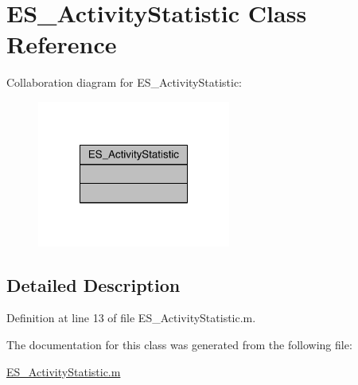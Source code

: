 \hypertarget{class_e_s___activity_statistic}{\section{E\+S\+\_\+\+Activity\+Statistic Class Reference}
\label{class_e_s___activity_statistic}
}


Collaboration diagram for E\+S\+\_\+\+Activity\+Statistic\+:\nopagebreak
\begin{figure}[H]
\begin{center}
\leavevmode
\includegraphics[width=180pt]{d1/d3f/class_e_s___activity_statistic__coll__graph}
\end{center}
\end{figure}


\subsection{Detailed Description}


Definition at line 13 of file E\+S\+\_\+\+Activity\+Statistic.\+m.



The documentation for this class was generated from the following file\+:\begin{DoxyCompactItemize}
\item 
\hyperlink{_e_s___activity_statistic_8m}{E\+S\+\_\+\+Activity\+Statistic.\+m}\end{DoxyCompactItemize}
